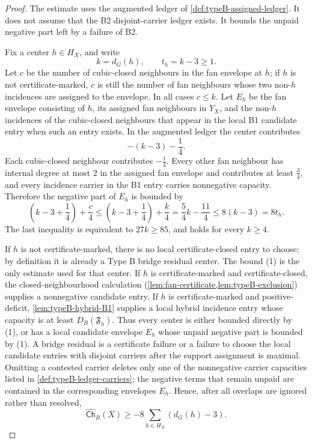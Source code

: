 \documentclass[11pt]{article}
\newcommand{\Ch}{\mathsf{Ch}}
\begin{document}
\begin{proof}
The estimate uses the augmented ledger of \cref{def:typeB-assigned-ledger}.  It
does not assume that the B2 disjoint-carrier ledger exists.  It bounds the
unpaid negative part left by a failure of B2.

Fix a center $h\in H_X$, and write
\[
k=d_G(h),\qquad t_h=k-3\ge1.
\]
Let $c$ be the number of cubic-closed neighbours in the fan envelope at $h$; if
$h$ is not certificate-marked, $c$ is still the number of fan neighbours whose
two non-$h$ incidences are assigned to the envelope.  In all cases $c\le k$.
Let $E_h$ be the fan envelope consisting of $h$, its assigned fan neighbours in
$Y_X$, and the non-$h$ incidences of the cubic-closed neighbours that appear in
the local B1 candidate entry when such an entry exists.  In the augmented ledger
the center contributes
\[
-(k-3)-\frac14 .
\]
Each cubic-closed neighbour contributes $-\tfrac14$.  Every other fan neighbour
has internal degree at most $2$ in the assigned fan envelope and contributes at
least $\tfrac34$, and every incidence carrier in the B1 entry carries
nonnegative capacity.  Therefore the negative part of $E_h$ is bounded by
\[
\left(k-3+\frac14\right)+\frac c4
\le
\left(k-3+\frac14\right)+\frac k4
=\frac54k-\frac{11}{4}
\le 8(k-3)=8t_h .
\tag{1}
\]
The last inequality is equivalent to $27k\ge85$, and holds for every $k\ge4$.

If $h$ is not certificate-marked, there is no local certificate-closed entry to
choose; by definition it is already a Type B bridge residual center.  The bound
(1) is the only estimate used for that center.  If $h$ is certificate-marked and
certificate-closed, the closed-neighbourhood calculation
(\cref{lem:fan-certificate,lem:typeB-exclusion}) supplies a nonnegative
candidate entry.  If $h$ is certificate-marked and positive-deficit,
\cref{lem:typeB-hybrid-B1} supplies a local hybrid incidence entry whose capacity
is at least $D_B(\mathfrak F_h)$.  Thus every center is either bounded directly
by (1), or has a local candidate envelope $E_h$ whose unpaid negative part is
bounded by (1).  A bridge residual is a certificate failure or a failure to
choose the local candidate entries with disjoint carriers after the support
assignment is maximal.  Omitting a contested carrier deletes only one of the
nonnegative carrier capacities listed in \cref{def:typeB-ledger-carriers}; the
negative terms that remain unpaid are contained in the corresponding envelopes
$E_h$.  Hence, after all overlaps are ignored rather than resolved,
\[
\widehat{\Ch}_B(X)
\ge
-8\sum_{h\in H_X}(d_G(h)-3).
\tag{2}
\]


\end{proof}
\end{document}
